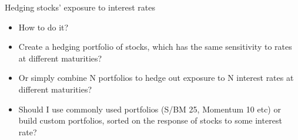 \documentclass{beamer}
\begin{document}
\begin{frame}{Hedging stocks' exposure to interest rates}
\begin{itemize}
    \item How to do it?
    \item Create a hedging portfolio of stocks, which has the same sensitivity to rates at different maturities?
    \item Or simply combine N portfolios to hedge out exposure to N interest rates at different maturities? 
    \item Should I use commonly used portfolios (S/BM 25, Momentum 10 etc) or build custom portfolios, sorted on the response of stocks to some interest rate?
\end{itemize}
\end{frame}
\end{document}
